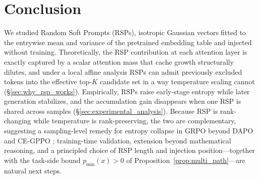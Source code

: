 
\section{Conclusion}\label{sec:conclusion}

We studied Random Soft Prompts (RSPs), isotropic Gaussian vectors fitted to the entrywise mean and variance of the pretrained embedding table and injected without training. Theoretically, the RSP contribution at each attention layer is exactly captured by a scalar attention mass that cache growth structurally dilutes, and under a local affine analysis RSPs can admit previously excluded tokens into the effective top-$K$ candidate set in a way temperature scaling cannot (\S\ref{sec:why_rsp_works}). Empirically, RSPs raise early-stage entropy while later generation stabilizes, and the accumulation gain disappears when one RSP is shared across samples (\S\ref{sec:experimental_analysis}). Because RSP is rank-changing while temperature is rank-preserving, the two are complementary, suggesting a sampling-level remedy for entropy collapse in GRPO \citep{shao2024deepseekmath} beyond DAPO \citep{yu2025dapo} and CE-GPPO \citep{su2025cegppo}; training-time validation, extension beyond mathematical reasoning, and a principled choice of RSP length and injection position---together with the task-side bound $p_{\min}(x){>}0$ of Proposition~\ref{prop:multi_path}---are natural next steps.
